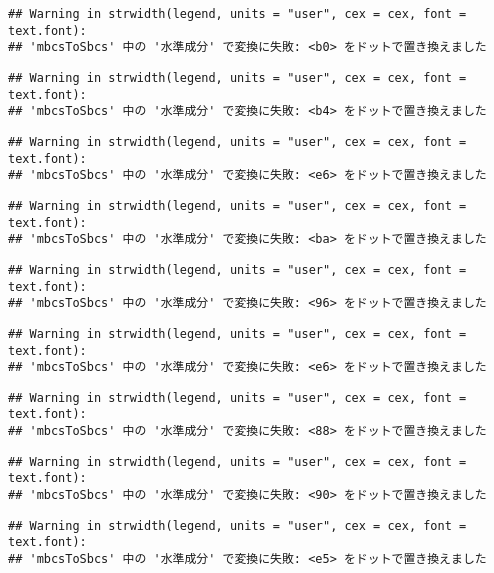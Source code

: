 \documentclass[]{article}
\begin{document}
\begin{verbatim}
## Warning in strwidth(legend, units = "user", cex = cex, font = text.font):
## 'mbcsToSbcs' 中の '水準成分' で変換に失敗: <b0> をドットで置き換えました
\end{verbatim}

\begin{verbatim}
## Warning in strwidth(legend, units = "user", cex = cex, font = text.font):
## 'mbcsToSbcs' 中の '水準成分' で変換に失敗: <b4> をドットで置き換えました
\end{verbatim}

\begin{verbatim}
## Warning in strwidth(legend, units = "user", cex = cex, font = text.font):
## 'mbcsToSbcs' 中の '水準成分' で変換に失敗: <e6> をドットで置き換えました
\end{verbatim}

\begin{verbatim}
## Warning in strwidth(legend, units = "user", cex = cex, font = text.font):
## 'mbcsToSbcs' 中の '水準成分' で変換に失敗: <ba> をドットで置き換えました
\end{verbatim}

\begin{verbatim}
## Warning in strwidth(legend, units = "user", cex = cex, font = text.font):
## 'mbcsToSbcs' 中の '水準成分' で変換に失敗: <96> をドットで置き換えました
\end{verbatim}

\begin{verbatim}
## Warning in strwidth(legend, units = "user", cex = cex, font = text.font):
## 'mbcsToSbcs' 中の '水準成分' で変換に失敗: <e6> をドットで置き換えました
\end{verbatim}

\begin{verbatim}
## Warning in strwidth(legend, units = "user", cex = cex, font = text.font):
## 'mbcsToSbcs' 中の '水準成分' で変換に失敗: <88> をドットで置き換えました
\end{verbatim}

\begin{verbatim}
## Warning in strwidth(legend, units = "user", cex = cex, font = text.font):
## 'mbcsToSbcs' 中の '水準成分' で変換に失敗: <90> をドットで置き換えました
\end{verbatim}

\begin{verbatim}
## Warning in strwidth(legend, units = "user", cex = cex, font = text.font):
## 'mbcsToSbcs' 中の '水準成分' で変換に失敗: <e5> をドットで置き換えました
\end{verbatim}
\end{document}
